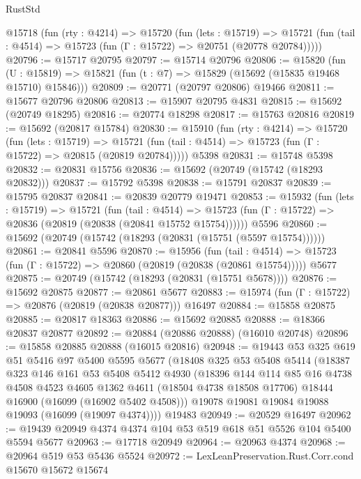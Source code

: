 \begin{lexlean}{RustStd}
\begin{coremodule}
  @15718
    (fun (rty : @4214) =>
    @15720
      (fun (lets : @15719) =>
      @15721 (fun (tail : @4514) => @15723 (fun (Γ : @15722) => @20751 (@20778 @20784)))))
@20796 := @15717 @20795
@20797 := @15714 @20796
@20806 := @15820
    (fun (U : @15819) => @15821 (fun (t : @7) => @15829 (@15692 (@15835 @19468 @15710) @15846)))
@20809 := @20771 (@20797 @20806) @19466
@20811 := @15677 @20796 @20806
@20813 := @15907 @20795 @4831
@20815 := @15692 (@20749 @18295)
@20816 := @20774 @18298
@20817 := @15763 @20816
@20819 := @15692 (@20817 @15784)
@20830 := @15910
    (fun (rty : @4214) =>
    @15720
      (fun (lets : @15719) =>
      @15721 (fun (tail : @4514) => @15723 (fun (Γ : @15722) => @20815 (@20819 @20784)))))
    @5398
@20831 := @15748 @5398
@20832 := @20831 @15756
@20836 := @15692 (@20749 (@15742 (@18293 @20832)))
@20837 := @15792 @5398
@20838 := @15791 @20837
@20839 := @15795 @20837
@20841 := @20839 @20779 @19471
@20853 := @15932
    (fun (lets : @15719) =>
    @15721
      (fun (tail : @4514) =>
      @15723 (fun (Γ : @15722) => @20836 (@20819 (@20838 (@20841 @15752 @15754))))))
    @5596
@20860 := @15692 (@20749 (@15742 (@18293 (@20831 (@15751 (@5597 @15754))))))
@20861 := @20841 @5596
@20870 := @15956
    (fun (tail : @4514) => @15723 (fun (Γ : @15722) => @20860 (@20819 (@20838 (@20861 @15754)))))
    @5677
@20875 := @20749 (@15742 (@18293 (@20831 (@15751 @5678))))
@20876 := @15692 @20875
@20877 := @20861 @5677
@20883 := @15974 (fun (Γ : @15722) => @20876 (@20819 (@20838 @20877))) @16497
@20884 := @15858 @20875
@20885 := @20817 @18363
@20886 := @15692 @20885
@20888 := @18366 @20837 @20877
@20892 := @20884 (@20886 @20888) (@16010 @20748)
@20896 := @15858 @20885 @20888 (@16015 @20816)
@20948 := @19443
    @53
    @325
    @619
    @51
    @5416
    @97
    @5400
    @5595
    @5677
    (@18408
      @325
      @53
      @5408
      @5414
      (@18387
        @323
        @146
        @161
        @53
        @5408
        @5412
        @4930
        (@18396
          @144
          @114
          @85
          @16
          @4738
          @4508
          @4523
          @4605
          @1362
          @4611
          (@18504 @4738 @18508 @17706)
          @18444
          @16900
          (@16099 (@16902 @5402 @4508)))
        @19078
        @19081
        @19084
        @19088
        @19093
        (@16099 (@19097 @4374))))
    @19483
@20949 := @20529 @16497
@20962 := @19439 @20949 @4374 @4374 @104 @53 @519 @618 @51 @5526 @104 @5400 @5594 @5677
@20963 := @17718 @20949
@20964 := @20963 @4374
@20968 := @20964 @519 @53 @5436 @5524
@20972 := LexLeanPreservation.Rust.Corr.cond @15670 @15672 @15674

\end{coremodule}
\end{lexlean}
